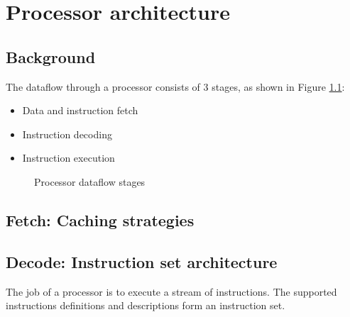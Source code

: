 \documentclass{report}
\begin{document}
\chapter{Processor architecture}

\section{Background}

The dataflow through a processor consists of 3 stages, as shown in Figure
\ref{fig:processor-dataflow-stages}:

\begin{itemize}

\item Data and instruction fetch
\item Instruction decoding
\item Instruction execution

\end{itemize}

\begin {figure}[H]
\centering
{}
\caption {Processor dataflow stages}
\label {fig:processor-dataflow-stages}
\end {figure}



\section{Fetch: Caching strategies}

\section{Decode: Instruction set architecture}

The job of a processor is to execute a stream of instructions. The supported
instructions definitions and descriptions form an instruction set.
\end{document}
